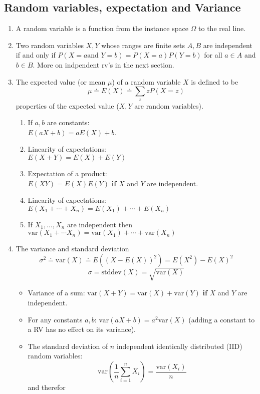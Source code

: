 \documentclass[10pt,twocolumn]{article}
\begin{document}
\newcommand{\var}[1]{\mbox{var}\left( #1 \right)}
\subsection*{Random variables, expectation and Variance}
\begin{enumerate}
\item A random variable is a function from the instance space $\Omega$
  to the real line.
\item Two random variables $X,Y$ whose ranges are finite sets $A,B$ 
are independent if and only if $P(X= a \mbox{
    and } Y = b)=P(X = a) P(Y = b)$ for all $a \in A$ and $b \in B$.
    More on indpendent rv's in the next section.
\item The expected value (or mean $\mu$) of a random variable $X$ is
  defined to be
\[ \mu \doteq E(X) \doteq \sum_z z P(X=z) \]
properties of the expected value ($X,Y$ are random variables).
\begin{enumerate}
\item If $a,b$ are constants:\\ $E(aX+b)=aE(X)+b$.
\item Linearity of expectations:\\ $E(X+Y)=E(X)+E(Y)$
\item Expectation of a product:\\ $E(XY)=E(X)E(Y)$ {\bf if} $X$ and $Y$ are independent.
\item Linearity of expectations:\\ $E(X_1+\cdots+X_n)=E(X_1)+\cdots
  +E(X_n)$
\item If $X_1,\ldots,X_n$ are independent then $\mbox{var}(X_1+
  \cdots X_n)= \mbox{var}(X_1)+\cdots +\mbox{var}(X_n)$
\end{enumerate}
\item The variance and standard deviation 
$$\sigma^2 \doteq \var{X} \doteq E((X-E(X))^2) = E(X^2) - E(X)^2$$
$$\sigma = \mbox{stddev}(X) = \sqrt{\mbox{var}(X)}$$
\begin{itemize}
\item
Variance of a sum: $\var{X+Y}=\var{X}+\var{Y}$ {\bf if} $X$ and $Y$
are independent.
\item For any constants $a,b$: $\mbox{var}(aX+b)=a^2 \mbox{var}(X)$
  (adding a constant to a RV has no effect on its variance).
\item 
The standard deviation of $n$ independent identically distributed
(IID) random variables:
\[
\var{\frac{1}{n} \sum_{i=1}^n X_i} = \frac{\var{X_i}}{n}
\]
and therefor

\end{itemize}
\end{enumerate}
\end{document}
